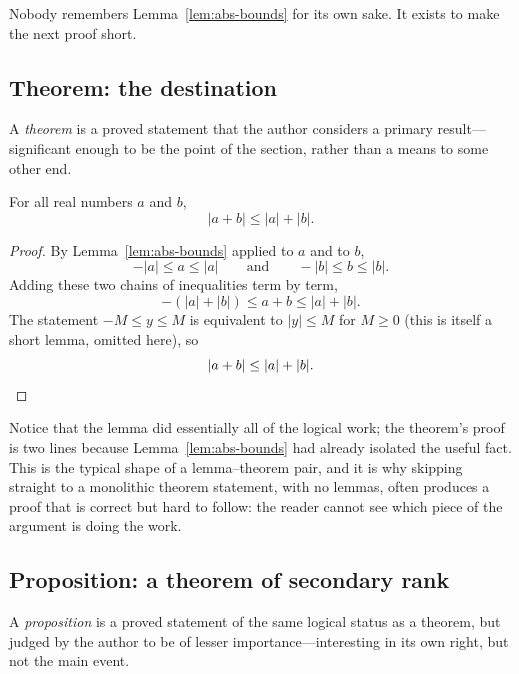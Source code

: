 \documentclass{essay}
\begin{document}
Nobody remembers Lemma~\ref{lem:abs-bounds} for its own sake. It exists to make the next proof short.

\subsection{Theorem: the destination}

\begin{definition}
A \emph{theorem} is a proved statement that the author considers a primary result---significant enough to be the point of the section, rather than a means to some other end.
\end{definition}

\begin{theorem}
\label{thm:triangle}
For all real numbers \(a\) and \(b\),
\[
|a+b|\le |a|+|b|.
\]
\end{theorem}

\begin{proof}
By Lemma~\ref{lem:abs-bounds} applied to \(a\) and to \(b\),
\[
-|a|\le a\le|a|
\qquad\text{and}\qquad
-|b|\le b\le|b|.
\]
Adding these two chains of inequalities term by term,
\[
-(|a|+|b|)\le a+b\le |a|+|b|.
\]
The statement \(-M\le y\le M\) is equivalent to \(|y|\le M\) for \(M\ge0\) (this is itself a short lemma, omitted here), so
\[
|a+b|\le |a|+|b|.
\qedhere
\]
\end{proof}

Notice that the lemma did essentially all of the logical work; the theorem's proof is two lines because Lemma~\ref{lem:abs-bounds} had already isolated the useful fact. This is the typical shape of a lemma--theorem pair, and it is why skipping straight to a monolithic theorem statement, with no lemmas, often produces a proof that is correct but hard to follow: the reader cannot see which piece of the argument is doing the work.

\subsection{Proposition: a theorem of secondary rank}

\begin{definition}
A \emph{proposition} is a proved statement of the same logical status as a theorem, but judged by the author to be of lesser importance---interesting in its own right, but not the main event.
\end{definition}
\end{document}
